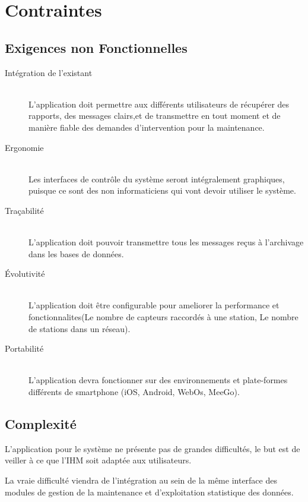 
\section{Contraintes}
\subsection{Exigences non Fonctionnelles}	
\begin{description}		
\item [Intégration de l'existant]\hfill\\
L'application doit permettre aux différents utilisateurs de récupérer des rapports, des messages clairs,et de transmettre en tout moment et de manière fiable des demandes d'intervention pour la maintenance.\\

\item [Ergonomie]\hfill\\
Les interfaces de contrôle du système seront intégralement graphiques, puisque ce sont des non informaticiens qui vont devoir utiliser le système.\\

\item [Traçabilité]\hfill\\
 L'application doit pouvoir transmettre tous les messages reçus à l'archivage dans les bases de données.\\

\item [Évolutivité]\hfill\\
L'application doit être configurable pour ameliorer la performance et fonctionnalites(Le nombre de capteurs raccordés à une station, Le nombre de stations dans un réseau).

\item [Portabilité]\hfill\\
L'application devra fonctionner sur des environnements et plate-formes différents de smartphone (iOS, Android, WebOs, MeeGo).

\end{description}

	
\subsection{Complexité}
	
L'application pour le système ne présente pas de grandes difficultés, le but est de veiller à ce que l'IHM soit adaptée aux utilisateurs.

La vraie difficulté viendra de l'intégration au sein de la même interface des modules de gestion de la maintenance et d'exploitation statistique des données.

